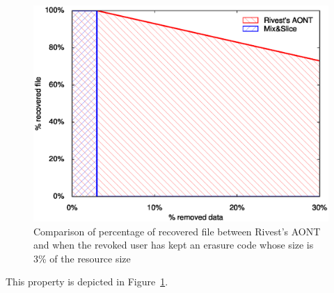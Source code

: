 {\begin{figure}[t]
	\centering
	\includegraphics[width=0.75\columnwidth]{figures/experiments/out}
	\caption{Comparison of percentage of recovered file between Rivest's AONT and \name when the revoked user has kept an erasure code whose size is 3\% of the resource size}
	\label{ms:aont-comparison}
\end{figure}

\noindent This property is depicted in Figure~\ref{ms:aont-comparison}.

} %

